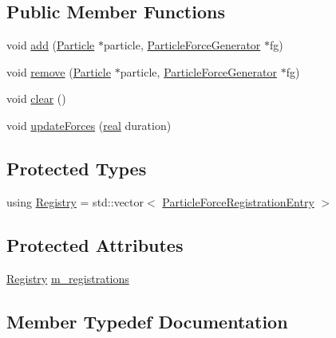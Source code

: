 \subsection*{Public Member Functions}
\begin{DoxyCompactItemize}
\item 
void \mbox{\hyperlink{classr3_1_1_particle_force_registry_ae8aafae43e822c8e5a3ccdde802b8aa9}{add}} (\mbox{\hyperlink{classr3_1_1_particle}{Particle}} $\ast$particle, \mbox{\hyperlink{classr3_1_1_particle_force_generator}{Particle\+Force\+Generator}} $\ast$fg)
\item 
void \mbox{\hyperlink{classr3_1_1_particle_force_registry_affea480593835fecf9b262f5b0114912}{remove}} (\mbox{\hyperlink{classr3_1_1_particle}{Particle}} $\ast$particle, \mbox{\hyperlink{classr3_1_1_particle_force_generator}{Particle\+Force\+Generator}} $\ast$fg)
\item 
void \mbox{\hyperlink{classr3_1_1_particle_force_registry_ac49c38fa041447278c56e68c6e796d77}{clear}} ()
\item 
void \mbox{\hyperlink{classr3_1_1_particle_force_registry_aff16efc19c65d28e39a38cbc936ede2a}{update\+Forces}} (\mbox{\hyperlink{namespacer3_ab2016b3e3f743fb735afce242f0dc1eb}{real}} duration)
\end{DoxyCompactItemize}
\subsection*{Protected Types}
\begin{DoxyCompactItemize}
\item 
using \mbox{\hyperlink{classr3_1_1_particle_force_registry_a5529157176d2c10b2afde82e6871c7eb}{Registry}} = std\+::vector$<$ \mbox{\hyperlink{structr3_1_1_particle_force_registry_1_1_particle_force_registration_entry}{Particle\+Force\+Registration\+Entry}} $>$
\end{DoxyCompactItemize}
\subsection*{Protected Attributes}
\begin{DoxyCompactItemize}
\item 
\mbox{\hyperlink{classr3_1_1_particle_force_registry_a5529157176d2c10b2afde82e6871c7eb}{Registry}} \mbox{\hyperlink{classr3_1_1_particle_force_registry_aadf01f7d6f670e7b32e3d185a0414c29}{m\+\_\+registrations}}
\end{DoxyCompactItemize}


\subsection{Member Typedef Documentation}
\mbox{\label{classr3_1_1_particle_force_registry_a5529157176d2c10b2afde82e6871c7eb}} 
